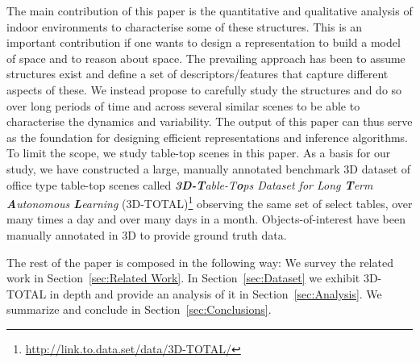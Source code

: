 \documentclass[letterpaper, 10 pt, conference]{ieeeconf}
\begin{document}
The main contribution of this paper is the quantitative and qualitative analysis of
indoor environments to characterise some of these structures. This is
an important contribution if one wants to design a representation to
build a model of space and to reason about space.  The prevailing
approach has been to assume structures exist and define a set of
descriptors/features that capture different aspects of these. We
instead propose to carefully study the structures and do so over long
periods of time and across several similar scenes to be able to characterise the
dynamics and variability. The output of this paper can thus serve as
the foundation for designing efficient representations and inference
algorithms. To limit the scope, we study table-top scenes in this
paper. As a basis for our study, we have constructed a large, manually annotated 
benchmark 3D dataset of office type table-top scenes called \textit{\textbf{3D-T}able-T\textbf{o}ps Dataset for Long \textbf{T}erm
  \textbf{A}utonomous \textbf{L}earning} (3D-TOTAL)\footnote{\url{http://link.to.data.set/data/3D-TOTAL/}} observing
the same set of select tables, over many times a day and over many
days in a month. Objects-of-interest have been manually annotated in
3D to provide ground truth data.

The rest of the paper is composed in the following way: We survey the related work in Section~\ref{sec:Related Work}. In Section~\ref{sec:Dataset} we exhibit 3D-TOTAL in depth and provide an 
analysis of it in Section~\ref{sec:Analysis}. We summarize and conclude in Section~\ref{sec:Conclusions}.


\end{document}

